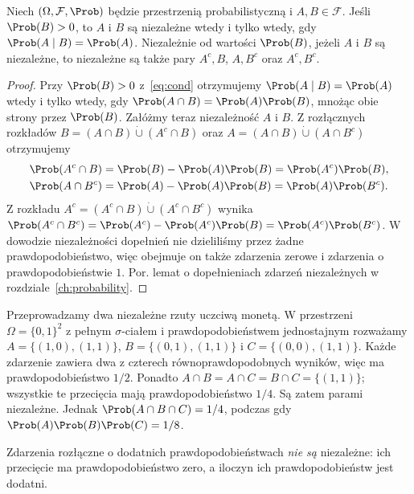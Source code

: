 \begin{stwierdzenie}
Niech $(\Omega,\mathcal F,\Prob)$ będzie przestrzenią probabilistyczną
i $A,B\in\mathcal F$. Jeśli $\Prob(B)>0$, to
$A$ i $B$ są niezależne wtedy i tylko wtedy, gdy
$\Prob(A\mid B)=\Prob(A)$. Niezależnie od wartości $\Prob(B)$,
jeżeli $A$ i $B$ są niezależne, to niezależne są także pary
$A^c,B$, $A,B^c$ oraz $A^c,B^c$.
\end{stwierdzenie}
\begin{proof}
Przy $\Prob(B)>0$ z~\eqref{eq:cond} otrzymujemy
$\Prob(A\mid B)=\Prob(A)$ wtedy i tylko wtedy, gdy
$\Prob(A\cap B)=\Prob(A)\Prob(B)$, mnożąc obie strony
przez $\Prob(B)$. Załóżmy teraz niezależność $A$ i $B$.
Z rozłącznych rozkładów $B=(A\cap B)\mathbin{\dot\cup}(A^c\cap B)$
oraz $A=(A\cap B)\mathbin{\dot\cup}(A\cap B^c)$ otrzymujemy
\begin{align*}
\Prob(A^c\cap B)&=\Prob(B)-\Prob(A)\Prob(B)
=\Prob(A^c)\Prob(B),\\
\Prob(A\cap B^c)&=\Prob(A)-\Prob(A)\Prob(B)
=\Prob(A)\Prob(B^c).
\end{align*}
Z rozkładu $A^c=(A^c\cap B)\mathbin{\dot\cup}(A^c\cap B^c)$
wynika $\Prob(A^c\cap B^c)=\Prob(A^c)-\Prob(A^c)\Prob(B)
=\Prob(A^c)\Prob(B^c)$. W dowodzie niezależności dopełnień
nie dzieliliśmy przez żadne prawdopodobieństwo, więc obejmuje
on także zdarzenia zerowe i zdarzenia o prawdopodobieństwie $1$.
Por. lemat o dopełnieniach zdarzeń niezależnych
w rozdziale~\ref{ch:probability}.
\end{proof}

\begin{przyklad}
Przeprowadzamy dwa niezależne rzuty uczciwą monetą.
W przestrzeni $\Omega=\{0,1\}^2$ z pełnym $\sigma$-ciałem
i prawdopodobieństwem jednostajnym rozważamy $A=\{(1,0),(1,1)\}$,
$B=\{(0,1),(1,1)\}$ i $C=\{(0,0),(1,1)\}$.
Każde zdarzenie zawiera dwa z czterech równoprawdopodobnych
wyników, więc ma prawdopodobieństwo $1/2$. Ponadto
$A\cap B=A\cap C=B\cap C=\{(1,1)\}$; wszystkie te
przecięcia mają prawdopodobieństwo $1/4$.
Są zatem parami niezależne. Jednak $\Prob(A\cap B\cap C)=1/4$,
podczas gdy $\Prob(A)\Prob(B)\Prob(C)=1/8$.
\end{przyklad}

\begin{uwaga}
Zdarzenia rozłączne o dodatnich prawdopodobieństwach \emph{nie są}
niezależne: ich przecięcie ma prawdopodobieństwo zero,
a iloczyn ich prawdopodobieństw jest dodatni.
\end{uwaga}

